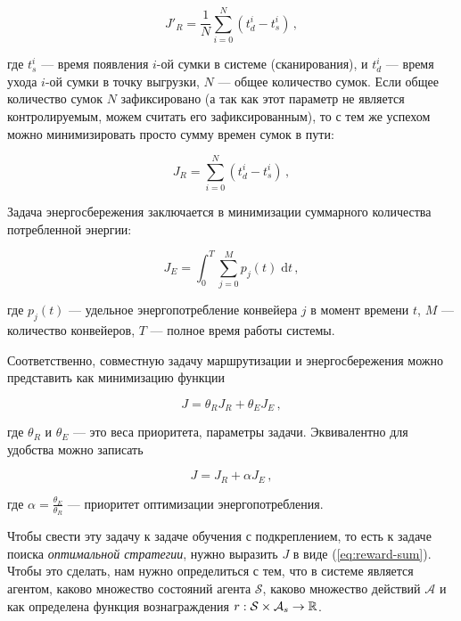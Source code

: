 \documentclass[specification,annotation,times]{itmo-student-thesis}
\theoremstyle{definition}
\begin{document}
\begin{equation}\label{eqs:J_r_avg}
  J'_R = \frac{1}{N} \sum\limits_{i=0}^{N} (t_d^i - t_s^i) \,,
\end{equation}

где $t_s^i$ --- время появления $i$-ой сумки в системе (сканирования), и
$t_d^i$ --- время ухода $i$-ой сумки в точку выгрузки, $N$ --- общее количество
сумок. Если общее количество сумок $N$ зафиксировано (а так как этот параметр не
является контролируемым, можем считать его зафиксированным), то с тем же успехом
можно минимизировать просто сумму времен сумок в пути:

\begin{equation}\label{eqs:J_r}
  J_R = \sum\limits_{i=0}^{N} (t_d^i - t_s^i) \,,
\end{equation}

Задача энергосбережения заключается в минимизации суммарного количества
потребленной энергии:

\begin{equation}\label{eqs:J_e}
  J_E = \int_0^T \! \sum\limits_{j=0}^{M} p_j(t) \; \mathrm{d}t \,,
\end{equation}

где $p_j(t)$ --- удельное энергопотребление конвейера $j$ в момент времени $t$,
$M$ --- количество конвейеров, $T$ --- полное время работы системы.

Соответственно, совместную задачу маршрутизации и энергосбережения можно
представить как минимизацию функции 

\begin{equation}
  J = \theta_R J_R + \theta_E J_E \,,
\end{equation}

где $\theta_R$ и $\theta_E$ --- это веса приоритета, параметры задачи.
Эквивалентно для удобства можно записать

\begin{equation}\label{eqs:J}
  J = J_R + \alpha J_E \,,
\end{equation}

где $\alpha = \frac{\theta_E}{\theta_R}$ --- приоритет оптимизации
энергопотребления.

Чтобы свести эту задачу к задаче обучения с подкреплением, то есть к задаче
поиска \textit{оптимальной стратегии}, нужно выразить $J$ в виде
(\ref{eq:reward-sum}). Чтобы это сделать, нам нужно определиться с тем, что в
системе является агентом, каково множество состояний агента $\mathcal{S}$,
каково множество действий $\mathcal{A}$ и как определена функция вознаграждения
$r : \mathcal{S} \times \mathcal{A}_s \rightarrow \Bbb{R}$.
\end{document}
